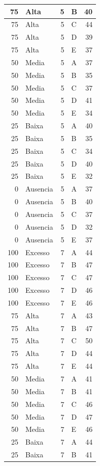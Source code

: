 \documentclass[
]{article}
\begin{document}
\begin{table}
\begin{tabular}[t]{r|l|r|l|r}
\hline
75 & Alta & 5 & B & 40\\
\hline
75 & Alta & 5 & C & 44\\
\hline
75 & Alta & 5 & D & 39\\
\hline
75 & Alta & 5 & E & 37\\
\hline
50 & Media & 5 & A & 37\\
\hline
50 & Media & 5 & B & 35\\
\hline
50 & Media & 5 & C & 37\\
\hline
50 & Media & 5 & D & 41\\
\hline
50 & Media & 5 & E & 34\\
\hline
25 & Baixa & 5 & A & 40\\
\hline
25 & Baixa & 5 & B & 35\\
\hline
25 & Baixa & 5 & C & 34\\
\hline
25 & Baixa & 5 & D & 40\\
\hline
25 & Baixa & 5 & E & 32\\
\hline
0 & Ausencia & 5 & A & 37\\
\hline
0 & Ausencia & 5 & B & 40\\
\hline
0 & Ausencia & 5 & C & 37\\
\hline
0 & Ausencia & 5 & D & 32\\
\hline
0 & Ausencia & 5 & E & 37\\
\hline
100 & Excesso & 7 & A & 44\\
\hline
100 & Excesso & 7 & B & 47\\
\hline
100 & Excesso & 7 & C & 47\\
\hline
100 & Excesso & 7 & D & 46\\
\hline
100 & Excesso & 7 & E & 46\\
\hline
75 & Alta & 7 & A & 43\\
\hline
75 & Alta & 7 & B & 47\\
\hline
75 & Alta & 7 & C & 50\\
\hline
75 & Alta & 7 & D & 44\\
\hline
75 & Alta & 7 & E & 44\\
\hline
50 & Media & 7 & A & 41\\
\hline
50 & Media & 7 & B & 41\\
\hline
50 & Media & 7 & C & 46\\
\hline
50 & Media & 7 & D & 47\\
\hline
50 & Media & 7 & E & 46\\
\hline
25 & Baixa & 7 & A & 44\\
\hline
25 & Baixa & 7 & B & 41\\

\end{tabular}
\end{table}
\end{document}
